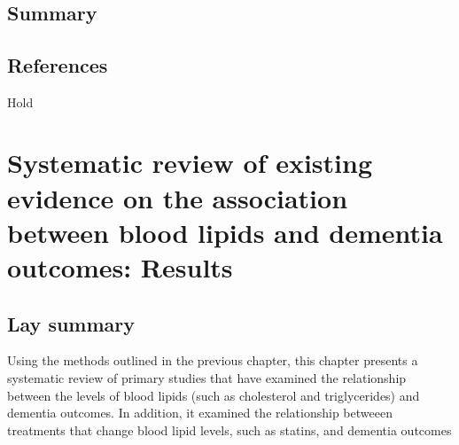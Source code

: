 \documentclass[a4paper, twoside]{templates/ociamthesis}
\begin{document}
~

\hypertarget{summary-2}{%
\section{Summary}\label{summary-2}}


\newpage

\hypertarget{references-2}{%
\section{References}\label{references-2}}

\begin{savequote}
Hold
\end{savequote}



\hypertarget{sys-rev-results-heading}{%
\chapter{Systematic review of existing evidence on the association between blood lipids and dementia outcomes: Results}\label{sys-rev-results-heading}}

\minitoc 

\hypertarget{lay-summary-3}{%
\section{Lay summary}\label{lay-summary-3}}

Using the methods outlined in the previous chapter, this chapter presents a systematic review of primary studies that have examined the relationship between the levels of blood lipids (such as cholesterol and triglycerides) and dementia outcomes. In addition, it examined the relationship betweeen treatments that change blood lipid levels, such as statins, and dementia outcomes
\end{document}
